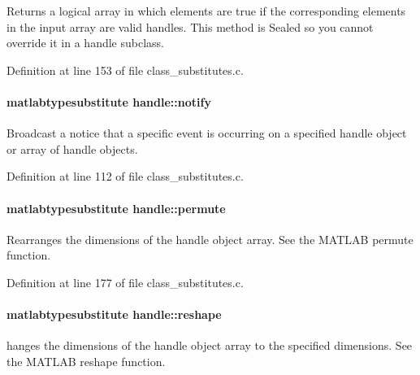 Returns a logical array in which elements are true if the corresponding elements in the input array are valid handles. This method is Sealed so you cannot override it in a handle subclass. 



Definition at line 153 of file class\+\_\+substitutes.\+c.

\paragraph[{\texorpdfstring{notify}{notify}}]{\setlength{\rightskip}{0pt plus 5cm}matlabtypesubstitute handle\+::notify}\hypertarget{classhandle_a8cfc3dab9d3ecc55b0b3449c2c7afd6f}{}\label{classhandle_a8cfc3dab9d3ecc55b0b3449c2c7afd6f}


Broadcast a notice that a specific event is occurring on a specified handle object or array of handle objects. 



Definition at line 112 of file class\+\_\+substitutes.\+c.

\paragraph[{\texorpdfstring{permute}{permute}}]{\setlength{\rightskip}{0pt plus 5cm}matlabtypesubstitute handle\+::permute}\hypertarget{classhandle_a6dc9f59313af54f392d8e273d71ace7b}{}\label{classhandle_a6dc9f59313af54f392d8e273d71ace7b}


Rearranges the dimensions of the handle object array. See the M\+A\+T\+L\+AB permute function. 



Definition at line 177 of file class\+\_\+substitutes.\+c.

\paragraph[{\texorpdfstring{reshape}{reshape}}]{\setlength{\rightskip}{0pt plus 5cm}matlabtypesubstitute handle\+::reshape}\hypertarget{classhandle_acef58ae5e52255411835a4fcaf2edd49}{}\label{classhandle_acef58ae5e52255411835a4fcaf2edd49}


hanges the dimensions of the handle object array to the specified dimensions. See the M\+A\+T\+L\+AB reshape function. 



